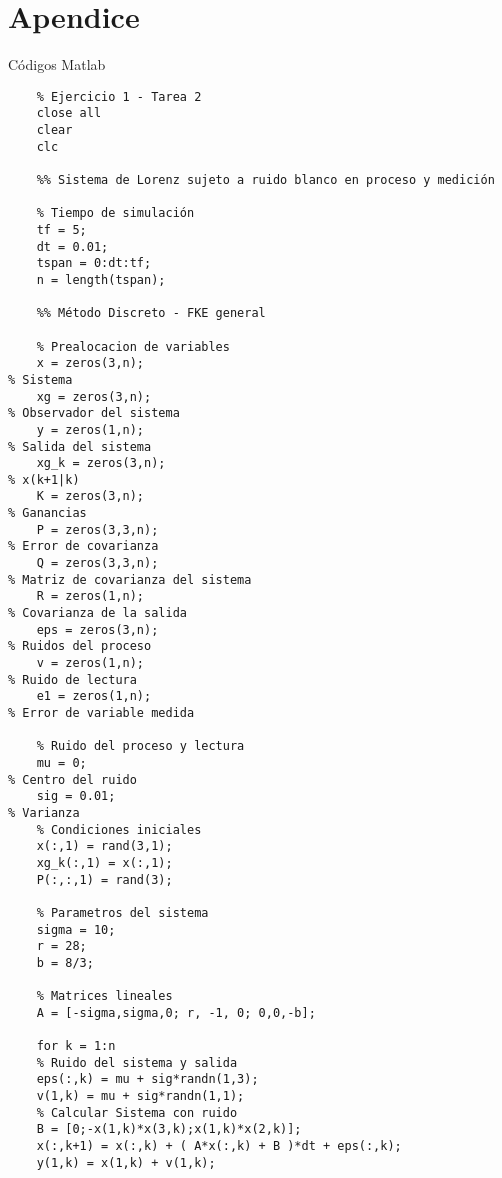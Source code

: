 \section*{Apendice\label{section:conclusion}}

\begin{Large}
Códigos Matlab
\end{Large}

	\begin{verbatim}
	% Ejercicio 1 - Tarea 2
	close all
	clear
	clc
	
	%% Sistema de Lorenz sujeto a ruido blanco en proceso y medición
	
	% Tiempo de simulación
	tf = 5;
	dt = 0.01;
	tspan = 0:dt:tf;
	n = length(tspan);
	
	%% Método Discreto - FKE general
	
	% Prealocacion de variables
	x = zeros(3,n);                                                             % Sistema
	xg = zeros(3,n);                                                            % Observador del sistema
	y = zeros(1,n);                                                             % Salida del sistema
	xg_k = zeros(3,n);                                                          % x(k+1|k)
	K = zeros(3,n);                                                             % Ganancias
	P = zeros(3,3,n);                                                           % Error de covarianza
	Q = zeros(3,3,n);                                                           % Matriz de covarianza del sistema
	R = zeros(1,n);                                                             % Covarianza de la salida
	eps = zeros(3,n);                                                           % Ruidos del proceso
	v = zeros(1,n);                                                             % Ruido de lectura
	e1 = zeros(1,n);                                                            % Error de variable medida
	
	% Ruido del proceso y lectura
	mu = 0;                                                                     % Centro del ruido
	sig = 0.01;                                                                 % Varianza
	% Condiciones iniciales
	x(:,1) = rand(3,1);
	xg_k(:,1) = x(:,1);
	P(:,:,1) = rand(3);
	
	% Parametros del sistema
	sigma = 10;
	r = 28;
	b = 8/3;
	
	% Matrices lineales
	A = [-sigma,sigma,0; r, -1, 0; 0,0,-b];
	
	for k = 1:n
	% Ruido del sistema y salida
	eps(:,k) = mu + sig*randn(1,3);
	v(1,k) = mu + sig*randn(1,1);
	% Calcular Sistema con ruido
	B = [0;-x(1,k)*x(3,k);x(1,k)*x(2,k)];
	x(:,k+1) = x(:,k) + ( A*x(:,k) + B )*dt + eps(:,k);
	y(1,k) = x(1,k) + v(1,k);
	

\end{verbatim}
